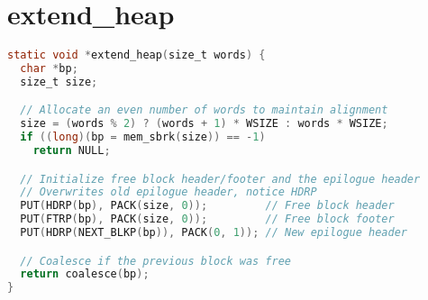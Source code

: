 \documentclass[11pt]{report}
\begin{document}
\section{extend\_heap}\label{appendix:malloc_lab_code_extend_heap}
\begin{lstlisting}[language=C]
    static void *extend_heap(size_t words) {
  char *bp;
  size_t size;

  // Allocate an even number of words to maintain alignment 
  size = (words % 2) ? (words + 1) * WSIZE : words * WSIZE;
  if ((long)(bp = mem_sbrk(size)) == -1)
    return NULL;

  // Initialize free block header/footer and the epilogue header 
  // Overwrites old epilogue header, notice HDRP
  PUT(HDRP(bp), PACK(size, 0));         // Free block header 
  PUT(FTRP(bp), PACK(size, 0));         // Free block footer 
  PUT(HDRP(NEXT_BLKP(bp)), PACK(0, 1)); // New epilogue header 

  // Coalesce if the previous block was free 
  return coalesce(bp);
}
\end{lstlisting}
\end{document}
